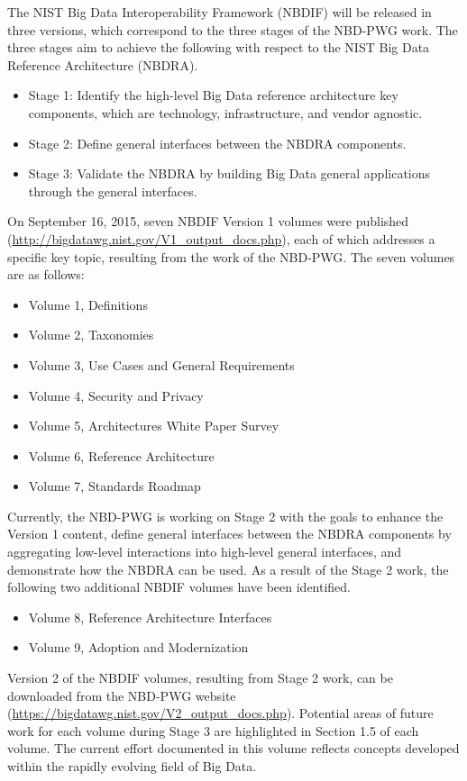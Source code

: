 The NIST Big Data Interoperability Framework (NBDIF) will be released
in three versions, which correspond to the three stages of the NBD-PWG
work. The three stages aim to achieve the following with respect to
the NIST Big Data Reference Architecture (NBDRA).

\begin{itemize}

\item Stage 1: Identify the high-level Big Data reference architecture
key components, which are technology, infrastructure, and vendor
agnostic.

\item Stage 2: Define general interfaces between the NBDRA components.

\item Stage 3: Validate the NBDRA by building Big Data general
applications through the general interfaces.
\end{itemize}

On September 16, 2015, seven NBDIF Version 1 volumes were published
(\url{http://bigdatawg.nist.gov/V1_output_docs.php}), each of which
addresses a specific key topic, resulting from the work of the
NBD-PWG. The seven volumes are as follows:

\begin{itemize}
\item	Volume 1, Definitions
\item	Volume 2, Taxonomies 
\item	Volume 3, Use Cases and General Requirements
\item	Volume 4, Security and Privacy 
\item	Volume 5, Architectures White Paper Survey
\item	Volume 6, Reference Architecture
\item	Volume 7, Standards Roadmap
\end{itemize}

Currently, the NBD-PWG is working on Stage 2 with the goals to enhance the Version 1 content, define general interfaces between the NBDRA components by aggregating low-level interactions into high-level general interfaces, and demonstrate how the NBDRA can be used. As a result of the Stage 2 work, the following two additional NBDIF volumes have been identified.

\begin{itemize}
\item	Volume 8, Reference Architecture Interfaces

\item	Volume 9, Adoption and Modernization
\end{itemize}

Version 2 of the NBDIF volumes, resulting from Stage 2 work, can be downloaded from the NBD-PWG website (\url{https://bigdatawg.nist.gov/V2_output_docs.php}). Potential areas of future work for each volume during Stage 3 are highlighted in Section 1.5 of each volume. The current effort documented in this volume reflects concepts developed within the rapidly evolving field of Big Data.




